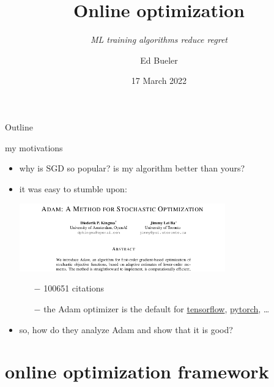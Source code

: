 \documentclass[xcolor={svgnames},
               hyperref={colorlinks,citecolor=DeepPink4,linkcolor=FireBrick,urlcolor=Maroon}]
               {beamer}
\title{Online optimization}
\subtitle{\emph{ML training algorithms reduce regret}}
\author{Ed Bueler}
\institute[UAF]{MATH 692 Mathematics for Machine Learning}
\date[]{17 March 2022}
\begin{document}
\beamertemplatenavigationsymbolsempty

\begin{frame}
  \maketitle
\end{frame}


\begin{frame}{Outline}
  \tableofcontents[hideallsubsections]
\end{frame}


\begin{frame}{my motivations}

\begin{itemize}
\item why is SGD so popular? is my algorithm better than yours?

\medskip
\item it was easy to stumble upon:

\medskip
\begin{center}
\includegraphics[width=0.7\textwidth]{figs/adam-paper.png}
\end{center}

\medskip
    \begin{itemize}
    \item[$-$] 100651 citations
    \item[$-$] the Adam optimizer is the default for \href{https://www.tensorflow.org/tutorials/keras/classification}{tensorflow}, \href{https://pytorch.org/docs/stable/optim.html}{pytorch}, \dots
    \end{itemize}

\medskip
\item so, how do they analyze Adam and show that it is good?
\end{itemize}
\end{frame}


\section{online optimization framework}
\end{document}
